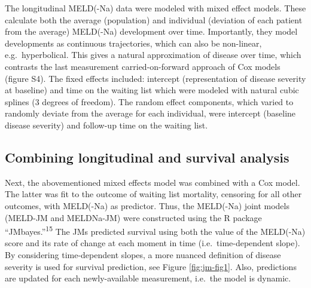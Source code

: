 \documentclass[11pt,english,]{book} %
\begin{document}
The longitudinal MELD(-Na) data were modeled with mixed effect models. These calculate both the average (population) and individual (deviation of each patient from the average) MELD(-Na) development over time. Importantly, they model developments as continuous trajectories, which can also be non-linear, e.g.~hyperbolical. This gives a natural approximation of disease over time, which contrasts the last measurement carried-on-forward approach of Cox models (figure S4). The fixed effects included: intercept (representation of disease severity at baseline) and time on the waiting list which were modeled with natural cubic splines (3 degrees of freedom). The random effect components, which varied to randomly deviate from the average for each individual, were intercept (baseline disease severity) and follow-up time on the waiting list.

\hypertarget{combining-longitudinal-and-survival-analysis}{%
\subsection*{Combining longitudinal and survival analysis}\label{combining-longitudinal-and-survival-analysis}}

Next, the abovementioned mixed effects model was combined with a Cox model. The latter was fit to the outcome of waiting list mortality, censoring for all other outcomes, with MELD(-Na) as predictor. Thus, the MELD(-Na) joint models (MELD-JM and MELDNa-JM) were constructed using the R package ``JMbayes.''\textsuperscript{15} The JMs predicted survival using both the value of the MELD(-Na) score and its rate of change at each moment in time (i.e.~time-dependent slope). By considering time-dependent slopes, a more nuanced definition of disease severity is used for survival prediction, see Figure \ref{fig:jm-fig1}. Also, predictions are updated for each newly-available measurement, i.e.~the model is dynamic.
\end{document}
